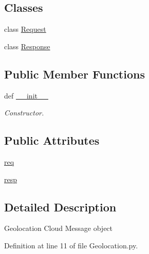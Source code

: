 \subsection*{Classes}
\begin{DoxyCompactItemize}
\item 
class \hyperlink{classRappCloud_1_1CloudMsgs_1_1Geolocation_1_1Geolocation_1_1Request}{Request}
\item 
class \hyperlink{classRappCloud_1_1CloudMsgs_1_1Geolocation_1_1Geolocation_1_1Response}{Response}
\end{DoxyCompactItemize}
\subsection*{Public Member Functions}
\begin{DoxyCompactItemize}
\item 
def \hyperlink{classRappCloud_1_1CloudMsgs_1_1Geolocation_1_1Geolocation_afbdca3ec0e77329b98eb0f38be85035b}{\-\_\-\-\_\-init\-\_\-\-\_\-}
\begin{DoxyCompactList}\small\item\em Constructor. \end{DoxyCompactList}\end{DoxyCompactItemize}
\subsection*{Public Attributes}
\begin{DoxyCompactItemize}
\item 
\hyperlink{classRappCloud_1_1CloudMsgs_1_1Geolocation_1_1Geolocation_ac037238916535a446ca413058246e5b5}{req}
\item 
\hyperlink{classRappCloud_1_1CloudMsgs_1_1Geolocation_1_1Geolocation_ab18b064be105d6e18ccd4af9dd7d3195}{resp}
\end{DoxyCompactItemize}


\subsection{Detailed Description}
\begin{DoxyVerb}Geolocation Cloud Message object \end{DoxyVerb}
 

Definition at line 11 of file Geolocation.\-py.



